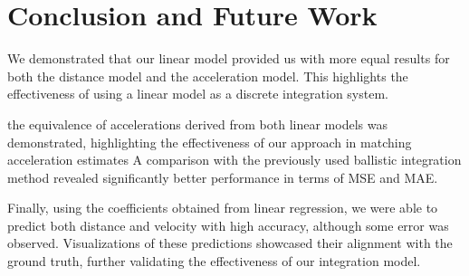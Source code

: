 \section{Conclusion and Future Work}

We demonstrated that our linear model provided us with more equal results for both the distance model and 
the acceleration model.
This highlights the effectiveness of using a linear model as a discrete integration system.


 the equivalence of accelerations derived from both linear models was demonstrated, highlighting the effectiveness of our approach in matching acceleration estimates
A comparison with the previously used ballistic integration method revealed significantly better performance in terms of MSE and MAE.

Finally, using the coefficients obtained from linear regression, we were able to predict both distance and velocity with high accuracy, although some error was observed. Visualizations of these predictions showcased their alignment with the ground truth, further validating the effectiveness of our integration model.